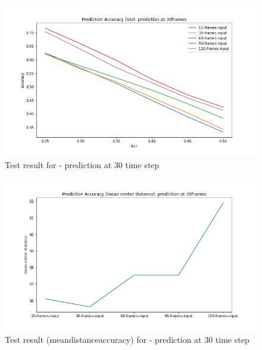 \begin{figure}[H] 
\includegraphics[scale=0.8]{prediction-at-30frames_IoU}
\begin{center}
\caption{Test result for - prediction at 30 time step }
\label{30-IoU}
\end{center}
\end{figure}

\begin{figure}[H] 
\includegraphics[scale=0.8]{prediction-at-30frames-mean_distance_accuracy}
\begin{center}
\caption{Test result (mean\textunderscore distance\textunderscore accuracy) for - prediction at 30 time step  }
\label{30-mcd}
\end{center}
\end{figure}


